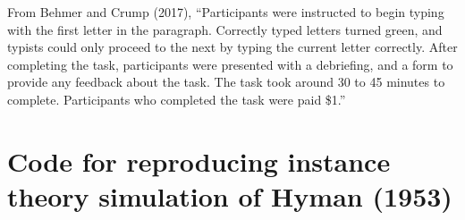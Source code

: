 \documentclass[,man,floatsintext]{apa6}
\begin{document}
From Behmer and Crump (2017), \enquote{Participants were instructed to begin typing with the first letter in the paragraph. Correctly typed letters turned green, and typists could only proceed to the next by typing the current letter correctly. After completing the task, participants were presented with a debriefing, and a form to provide any feedback about the task. The task took around 30 to 45 minutes to complete. Participants who completed the task were paid \$1.}

\hypertarget{code-for-reproducing-instance-theory-simulation-of-hyman-1953}{%
\section{Code for reproducing instance theory simulation of Hyman (1953)}\label{code-for-reproducing-instance-theory-simulation-of-hyman-1953}}
\end{document}
